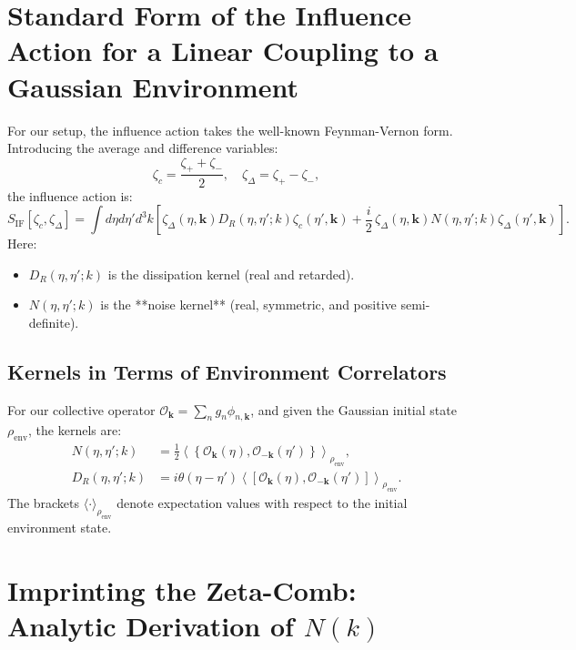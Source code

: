 \documentclass[12pt]{article}
\begin{document}
\section{Standard Form of the Influence Action for a Linear Coupling to a Gaussian Environment}

For our setup, the influence action takes the well-known Feynman-Vernon form. Introducing the average and difference variables:
\begin{equation}
\zeta_c = \frac{\zeta_+ + \zeta_-}{2}, \quad \zeta_\Delta = \zeta_+ - \zeta_-,
\end{equation}
the influence action is:
\begin{equation}
S_{\text{IF}}[\zeta_c, \zeta_\Delta] = \int d\eta d\eta' d^3k \left[ \zeta_\Delta(\eta,\bm{k}) D_R(\eta,\eta';k) \zeta_c(\eta',\bm{k}) + \frac{i}{2}\, \zeta_\Delta(\eta,\bm{k}) N(\eta,\eta';k) \zeta_\Delta(\eta',\bm{k}) \right].
\label{eq:IF_form}
\end{equation}
Here:
\begin{itemize}
    \item $D_R(\eta,\eta';k)$ is the dissipation kernel (real and retarded).
    \item $N(\eta,\eta';k)$ is the **noise kernel** (real, symmetric, and positive semi-definite).
\end{itemize}

\subsection{Kernels in Terms of Environment Correlators}
For our collective operator $\mathcal{O}_{\bm{k}} = \sum_n g_n \phi_{n,\bm{k}}$, and given the Gaussian initial state $\rho_{\text{env}}$, the kernels are:
\begin{align}
N(\eta,\eta';k) &= \frac{1}{2}\left\langle \left\{\mathcal{O}_{\bm{k}}(\eta), \mathcal{O}_{-\bm{k}}(\eta')\right\} \right\rangle_{\rho_{\text{env}}}, \label{eq:noise_kernel_def} \\
D_R(\eta,\eta';k) &= i \theta(\eta-\eta') \left\langle \left[\mathcal{O}_{\bm{k}}(\eta), \mathcal{O}_{-\bm{k}}(\eta')\right] \right\rangle_{\rho_{\text{env}}}. \label{eq:dissipation_kernel_def}
\end{align}
The brackets $\langle \cdot \rangle_{\rho_{\text{env}}}$ denote expectation values with respect to the initial environment state.

\section{Imprinting the Zeta-Comb: Analytic Derivation of $N(k)$}
\label{sec:zeta_comb}
\end{document}
